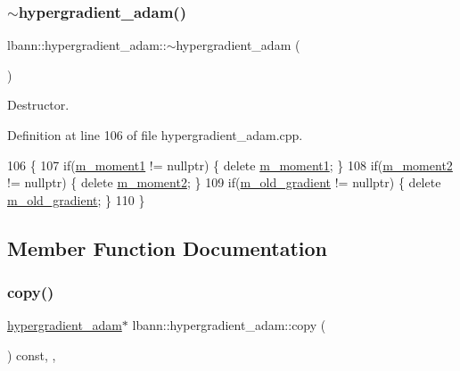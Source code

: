 \subsubsection{\texorpdfstring{$\sim$hypergradient\+\_\+adam()}{~hypergradient\_adam()}}
{\footnotesize\ttfamily lbann\+::hypergradient\+\_\+adam\+::$\sim$hypergradient\+\_\+adam (\begin{DoxyParamCaption}{ }\end{DoxyParamCaption})\hspace{0.3cm}{\ttfamily [override]}}

Destructor. 

Definition at line 106 of file hypergradient\+\_\+adam.\+cpp.


\begin{DoxyCode}
106                                         \{
107   \textcolor{keywordflow}{if}(\hyperlink{classlbann_1_1hypergradient__adam_a529f3b53732247ebfb649f55f1fae4d6}{m\_moment1} != \textcolor{keyword}{nullptr})      \{ \textcolor{keyword}{delete} \hyperlink{classlbann_1_1hypergradient__adam_a529f3b53732247ebfb649f55f1fae4d6}{m\_moment1}; \}
108   \textcolor{keywordflow}{if}(\hyperlink{classlbann_1_1hypergradient__adam_a73b77fb79bd8e9bbfc8f360197899d18}{m\_moment2} != \textcolor{keyword}{nullptr})      \{ \textcolor{keyword}{delete} \hyperlink{classlbann_1_1hypergradient__adam_a73b77fb79bd8e9bbfc8f360197899d18}{m\_moment2}; \}
109   \textcolor{keywordflow}{if}(\hyperlink{classlbann_1_1hypergradient__adam_a2e52355f77edf55bdac8a3eed79f44c4}{m\_old\_gradient} != \textcolor{keyword}{nullptr}) \{ \textcolor{keyword}{delete} \hyperlink{classlbann_1_1hypergradient__adam_a2e52355f77edf55bdac8a3eed79f44c4}{m\_old\_gradient}; \}
110 \}
\end{DoxyCode}


\subsection{Member Function Documentation}
\mbox{\label{classlbann_1_1hypergradient__adam_a09a7e0bbae7d18cc94a2f5ad098f1f38}} 
\subsubsection{\texorpdfstring{copy()}{copy()}}
{\footnotesize\ttfamily \hyperlink{classlbann_1_1hypergradient__adam}{hypergradient\+\_\+adam}$\ast$ lbann\+::hypergradient\+\_\+adam\+::copy (\begin{DoxyParamCaption}{ }\end{DoxyParamCaption}) const\hspace{0.3cm}{\ttfamily [inline]}, {\ttfamily [override]}, {\ttfamily [virtual]}}

